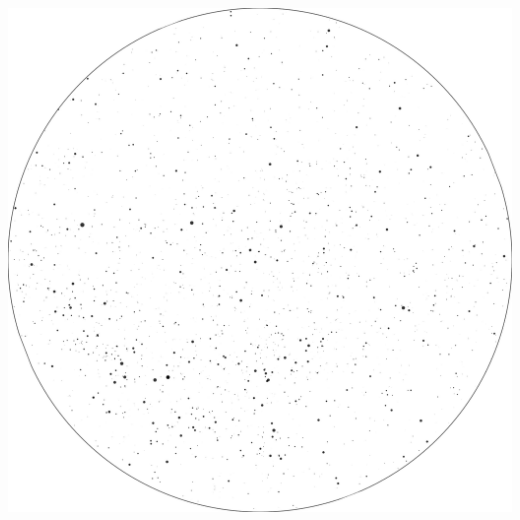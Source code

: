 \documentclass{./SAS-class-skygen}
\begin{document}
	\vspace{0.5cm}
    \begin{center}
    \includegraphics[width=\textwidth]{./pics/skychart14.png}
    \end{center}
    
    
\end{document}

